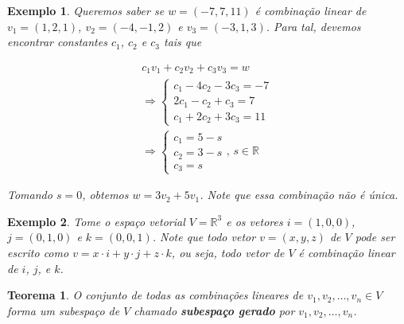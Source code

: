 \documentclass{article}
\newtheorem{theorem}{Teorema}[section]
\newtheorem*{example}{Exemplo}
\begin{document}
\begin{example}
	Queremos saber se $w = (-7, 7, 11)$ é combinação linear de $v_1 = (1,2,1)$, $v_2 = (-4, -1, 2)$ e $v_3 = (-3, 1, 3)$. Para tal, devemos encontrar constantes $c_1$, $c_2$ e $c_3$ tais que 
	
	\begin{align*}
	c_1v_1 + c_2v_2 + c_3v_3 = w \\
	\Rightarrow\begin{cases}
	c_1 - 4c_2 - 3c_3 = -7 \\
	2c_1 - c_2 + c_3 = 7 \\
	c_1 + 2c_2 + 3c_3 = 11
	\end{cases}\\
	\Rightarrow \begin{cases}
	c_1 = 5-s \\
	c_2 = 3-s \\
	c_3 = s
	\end{cases}\text{, $s\in\mathbb{R}$}
	\end{align*}
\par\vspace{0.3cm} Tomando $s = 0$, obtemos $w = 3v_2 + 5v_1$. Note que essa combinação não é única.

\end{example}

\begin{example}
	Tome o espaço vetorial $V = \mathbb{R}^3$ e os vetores $i = (1,0,0)$, $j = (0,1,0)$ e $k = (0,0,1)$. Note que todo vetor $v = (x,y,z)$ de $V$ pode ser escrito como $v = x\cdot i + y\cdot j + z\cdot k$, ou seja, todo vetor de $V$ é combinação linear de $i$, $j$, e $k$.
\end{example}

\begin{theorem}
	O conjunto de todas as combinações lineares de $v_1, v_2, \dots, v_n\in V$ forma um subespaço de $V$ chamado \textbf{subespaço gerado} por $v_1, v_2, \dots, v_n$.
\end{theorem}
\end{document}
